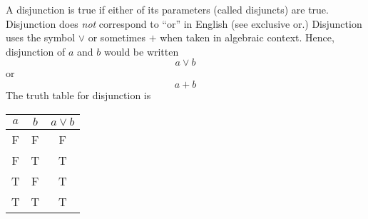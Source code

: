 \documentclass[12pt]{article}
\begin{document}
A disjunction is true if either of its parameters (called disjuncts) are true.  Disjunction does \emph{not} correspond to ``or'' in English (see exclusive or.)  Disjunction uses the symbol $\lor$ or sometimes $+$ when taken in algebraic context.  Hence, disjunction of $a$ and $b$ would be written $$ a \lor b $$ or $$ a + b $$  The truth table for  disjunction is 

\begin{center}
\begin{tabular}{ccc}
$a$ & $b$ & $a \lor b$ \\
\hline
F & F & F \\
F & T & T \\
T & F & T \\
T & T & T
\end{tabular}
\end{center}
\end{document}
